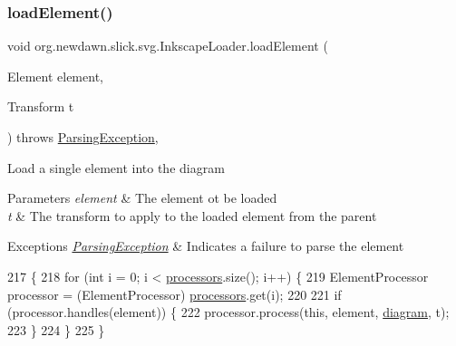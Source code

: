 \mbox{\label{classorg_1_1newdawn_1_1slick_1_1svg_1_1_inkscape_loader_a003d181b8ad2fe05d1a9203ec11faea6}} 
\subsubsection{\texorpdfstring{load\+Element()}{loadElement()}}
{\footnotesize\ttfamily void org.\+newdawn.\+slick.\+svg.\+Inkscape\+Loader.\+load\+Element (\begin{DoxyParamCaption}\item[{Element}]{element,  }\item[{Transform}]{t }\end{DoxyParamCaption}) throws \mbox{\hyperlink{classorg_1_1newdawn_1_1slick_1_1svg_1_1_parsing_exception}{Parsing\+Exception}}\hspace{0.3cm}{\ttfamily [inline]}, {\ttfamily [private]}}

Load a single element into the diagram


\begin{DoxyParams}{Parameters}
{\em element} & The element ot be loaded \\
\hline
{\em t} & The transform to apply to the loaded element from the parent \\
\hline
\end{DoxyParams}

\begin{DoxyExceptions}{Exceptions}
{\em \mbox{\hyperlink{classorg_1_1newdawn_1_1slick_1_1svg_1_1_parsing_exception}{Parsing\+Exception}}} & Indicates a failure to parse the element \\
\hline
\end{DoxyExceptions}

\begin{DoxyCode}
217                                     \{
218         \textcolor{keywordflow}{for} (\textcolor{keywordtype}{int} i = 0; i < \mbox{\hyperlink{classorg_1_1newdawn_1_1slick_1_1svg_1_1_inkscape_loader_a7ea6c8ad87a772c53ee88c0e3a9e9146}{processors}}.size(); i++) \{
219             ElementProcessor processor = (ElementProcessor) \mbox{\hyperlink{classorg_1_1newdawn_1_1slick_1_1svg_1_1_inkscape_loader_a7ea6c8ad87a772c53ee88c0e3a9e9146}{processors}}.get(i);
220 
221             \textcolor{keywordflow}{if} (processor.handles(element)) \{
222                 processor.process(\textcolor{keyword}{this}, element, \mbox{\hyperlink{classorg_1_1newdawn_1_1slick_1_1svg_1_1_inkscape_loader_a42085121425f35e4e3be17052cf39dbc}{diagram}}, t);
223             \}
224         \}
225     \}
\end{DoxyCode}


